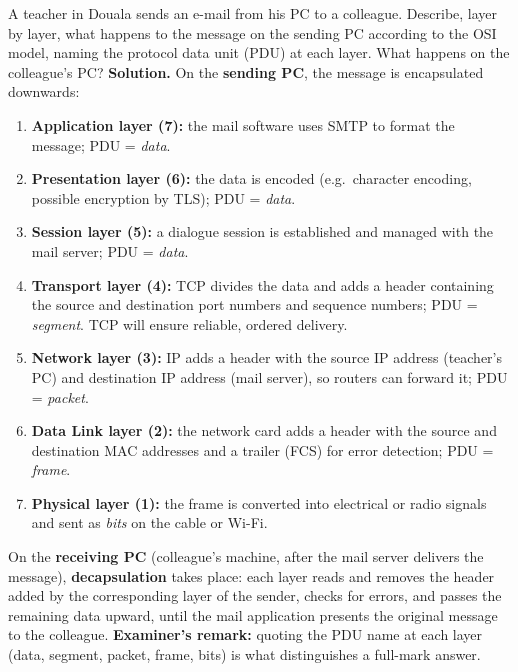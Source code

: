 \documentclass[11pt]{article}
\begin{document}
\begin{exoresolu}
A teacher in Douala sends an e-mail from his PC to a colleague. Describe, layer by layer, what happens to the message on the sending PC according to the OSI model, naming the protocol data unit (PDU) at each layer. What happens on the colleague's PC?
\tcblower
\textbf{Solution.} On the \textbf{sending PC}, the message is encapsulated downwards:
\begin{enumerate}
\item \textbf{Application layer (7):} the mail software uses SMTP to format the message; PDU = \emph{data}.
\item \textbf{Presentation layer (6):} the data is encoded (e.g.\ character encoding, possible encryption by TLS); PDU = \emph{data}.
\item \textbf{Session layer (5):} a dialogue session is established and managed with the mail server; PDU = \emph{data}.
\item \textbf{Transport layer (4):} TCP divides the data and adds a header containing the source and destination port numbers and sequence numbers; PDU = \emph{segment}. TCP will ensure reliable, ordered delivery.
\item \textbf{Network layer (3):} IP adds a header with the source IP address (teacher's PC) and destination IP address (mail server), so routers can forward it; PDU = \emph{packet}.
\item \textbf{Data Link layer (2):} the network card adds a header with the source and destination MAC addresses and a trailer (FCS) for error detection; PDU = \emph{frame}.
\item \textbf{Physical layer (1):} the frame is converted into electrical or radio signals and sent as \emph{bits} on the cable or Wi-Fi.
\end{enumerate}
On the \textbf{receiving PC} (colleague's machine, after the mail server delivers the message), \textbf{decapsulation} takes place: each layer reads and removes the header added by the corresponding layer of the sender, checks for errors, and passes the remaining data upward, until the mail application presents the original message to the colleague.
\textbf{Examiner's remark:} quoting the PDU name at each layer (data, segment, packet, frame, bits) is what distinguishes a full-mark answer.
\end{exoresolu}
\end{document}
